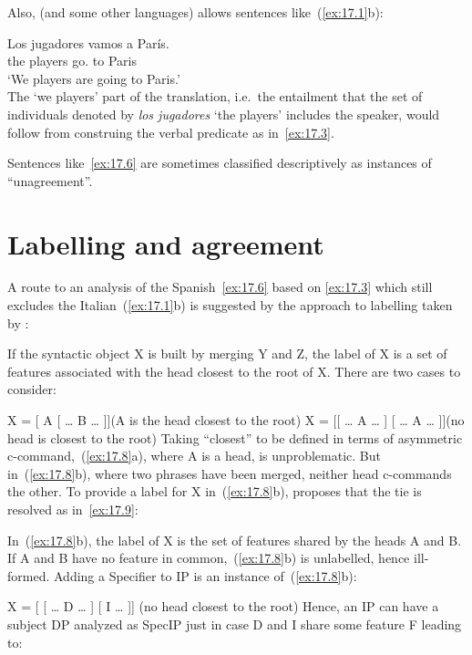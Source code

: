 \documentclass[output=paper]{langsci/langscibook}
\begin{document}
Also,  (and some other languages) allows sentences
like~(\ref{ex:17.1}b):

\ea\label{ex:17.6}
    \gll    Los jugadores vamos a París.\\
            the players   go.\Fpl{} to Paris\\
    \glt    ‘We players are going to Paris.’\\
\z
The ‘we players’ part of the translation, i.e.\ the entailment that the set of
individuals denoted by \emph{los jugadores} ‘the players’ includes the speaker,
would follow from construing the verbal predicate as in~\eqref{ex:17.3}.

Sentences like~\eqref{ex:17.6} are sometimes classified descriptively as
instances of “un\-agreement”.

\section{Labelling and agreement}\label{sec:17.2}

A route to an analysis of the Spanish~\eqref{ex:17.6} based on \eqref{ex:17.3} which still
excludes the Italian~(\ref{ex:17.1}b) is suggested by the approach to labelling
taken by \citet{Chomsky2013}:

\ea\label{ex:17.7}
    If the syntactic object X is built by merging Y and Z, the label of X is a set
    of features associated with the head closest to the root of X.
\z
There are two cases to consider:

\ea\label{ex:17.8}
    \ea X = [ A [ \dots{} B \dots{} ]]\hfill(A is the head closest to the root)
    \ex X = [[ \dots{} A \dots{} ] [ \dots{} A \dots{} ]]\hfill(no head is closest to the root)
    \z
\z
Taking “closest” to be defined in terms of asymmetric
c-command,~(\ref{ex:17.8}a), where A is a head, is unproblematic. But
in~(\ref{ex:17.8}b), where two phrases have been merged, neither head
c-commands the other. To provide a label for X in~(\ref{ex:17.8}b),
\textcite{Chomsky2013} proposes that the tie is resolved as
in~\eqref{ex:17.9}:

\ea\label{ex:17.9}
    \ea In~(\ref{ex:17.8}b), the label of X is the set of features shared by the
    heads A and B.
    \ex If A and B have no feature in common,~(\ref{ex:17.8}b) is unlabelled,
    hence ill-formed.
    \z
\z
Adding a Specifier to IP is an instance of~(\ref{ex:17.8}b):

\ea\label{ex:17.10}
    X = [ [ \dots{} D \dots{} ] [ I \dots{} ]] (no head closest to the root)
\z
Hence, an IP can have a subject DP analyzed as SpecIP just in case D and I
share some feature F leading to:
\end{document}
